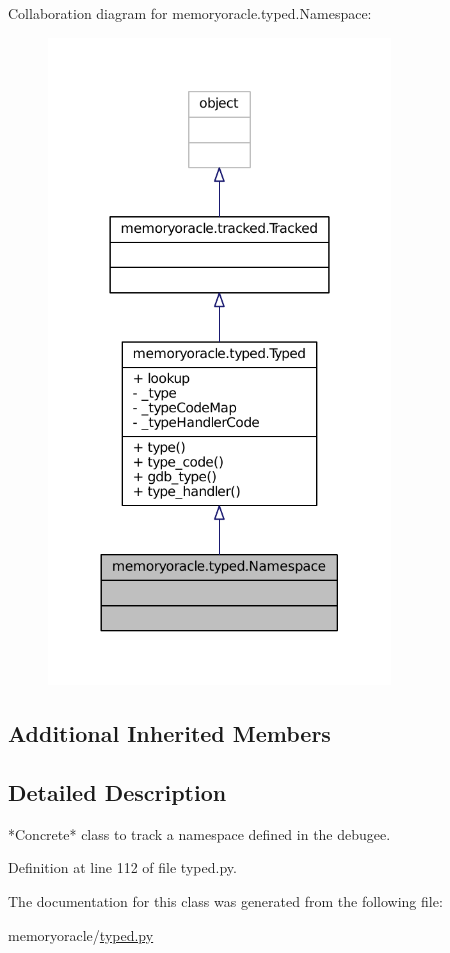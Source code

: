 Collaboration diagram for memoryoracle.\+typed.\+Namespace\+:\nopagebreak
\begin{figure}[H]
\begin{center}
\leavevmode
\includegraphics[width=257pt]{classmemoryoracle_1_1typed_1_1Namespace__coll__graph}
\end{center}
\end{figure}
\subsection*{Additional Inherited Members}


\subsection{Detailed Description}
\begin{DoxyVerb}*Concrete* class to track a namespace defined in the debugee.
\end{DoxyVerb}
 

Definition at line 112 of file typed.\+py.



The documentation for this class was generated from the following file\+:\begin{DoxyCompactItemize}
\item 
memoryoracle/\hyperlink{typed_8py}{typed.\+py}\end{DoxyCompactItemize}

